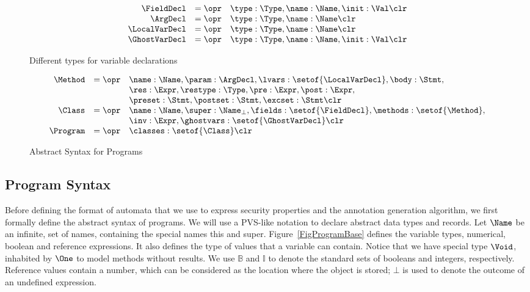 \begin{figure}[t]
\[
\begin{array}{rcl}
\FieldDecl & = \opr & \type : \Type, \name : \Name, \init : \Val \clr\\
\ArgDecl & = \opr & \type : \Type, \name : \Name \clr\\
\LocalVarDecl & = \opr & \type : \Type, \name : \Name \clr\\
\GhostVarDecl & = \opr & \type : \Type, \name : \Name, \init : \Val \clr\\
\end{array}
\]
\caption{Different types for variable declarations}\label{FigDeclarations}
\end{figure}

\begin{figure}[t]
\[
\begin{array}{rcl}
\Method & = \opr & \name : \Name, 
                   \param : \ArgDecl, 
                   \lvars : \setof{\LocalVarDecl},
                   \body : \Stmt,\\
        &        & \res : \Expr,
                   \restype : \Type,
                   \pre : \Expr,
                   \post : \Expr, \\
        &        & \preset : \Stmt,
                   \postset : \Stmt,
                   \excset : \Stmt \clr \\
\Class & = \opr & \name : \Name,
                  \super : \Name_{\bot},
                  \fields : \setof{\FieldDecl},
                  \methods : \setof{\Method},\\
        &       & \inv : \Expr,
                  \ghostvars : \setof{\GhostVarDecl} \clr\\
\Program & = \opr & \classes : \setof{\Class} \clr
\end{array}
\]
\caption{Abstract Syntax for Programs}\label{FigProgram}
\end{figure}

\subsection{Program Syntax}\label{SecSyntax}

Before defining the format of automata that we use to express security
properties and the annotation generation algorithm, we first formally
define the abstract syntax of programs. We will use a PVS-like
notation to declare abstract data types and records. Let \(\Name\) be
an infinite, set of names, containing the special names \textsf{this}
and \textsf{super}. Figure~\ref{FigProgramBase} defines the variable
types, numerical, boolean and reference expressions. It also defines
the type of values that a variable can contain. Notice that we have
special type \(\Void\), inhabited by \(\One\) to model methods without
results. We use \(\mathbb{B}\) and \(\mathbb{I}\) to denote the
standard sets of booleans and integers, respectively. Reference values
contain a number, which can be considered as the location where the
object is stored; \(\bot\) is used to denote the outcome of an
undefined expression. 

